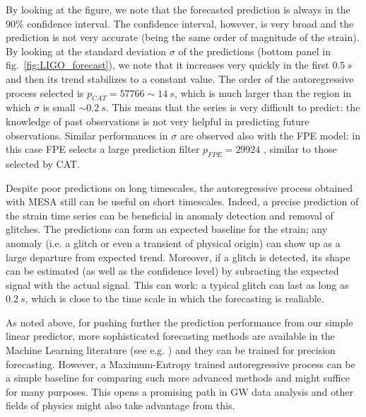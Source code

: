 \documentclass[twocolumn,showpacs,preprintnumbers,nofootinbib,prd,
superscriptaddress,10pt]{revtex4-1}
\begin{document}
By looking at the figure, we note that the forecasted prediction is always in the $90\%$ confidence interval.
The confidence interval, however, is very broad and the prediction is not very accurate (being the same order of magnitude of the strain).
By looking at the standard deviation $\sigma$ of the predictions (bottom panel in fig.~\ref{fig:LIGO_forecast}), we note that it increases very quickly in the first $\SI{0.5}{s}$ and then its trend stabilizes to a constant value.
The order of the autoregressive process selected is $p_{CAT} = 57766 \sim \SI{14}{s}$, which is much larger than the region in which $\sigma$ is small $\sim \SI{0.2}{s}$. This means that the series is very difficult to predict: the knowledge of past observations is not very helpful in predicting future observations.
Similar performances in $\sigma$ are observed also with the FPE model: in this case FPE selects a large prediction filter $p_{FPE} = 29924$ , similar to those selected by CAT.

Despite poor predictions on long timescales, the autoregressive process obtained with MESA still can be useful on short timescales. Indeed, a precise prediction of the strain time series can be beneficial in anomaly detection and removal of glitches. The predictions can form an expected baseline for the strain; any anomaly (i.e. a glitch or even a transient of physical origin) can show up as a large departure from expected trend.
Moreover, if a glitch is detected, its shape can be estimated (as well as the confidence level) by subracting the expected signal with the actual signal.
This can work: a typical glitch \cite{Zevin_2017} can last as long as $\SI{0.2}{s}$, which is close to the time scale in which the forecasting is realiable.

As noted above, for pushing further the prediction performance from our simple linear predictor, more sophisticated forecasting methods are available in the Machine Learning literature (see e.g. \cite{LSTM_article, oord2016wavenet}) and they can be trained for precision forecasting. However, a Maximum-Entropy trained autoregressive process can be a simple baseline for comparing such more advanced methods and might suffice for many purposes.
This opens a promising path in GW data analysis and other fields of physics might also take advantage from this.
\end{document}

